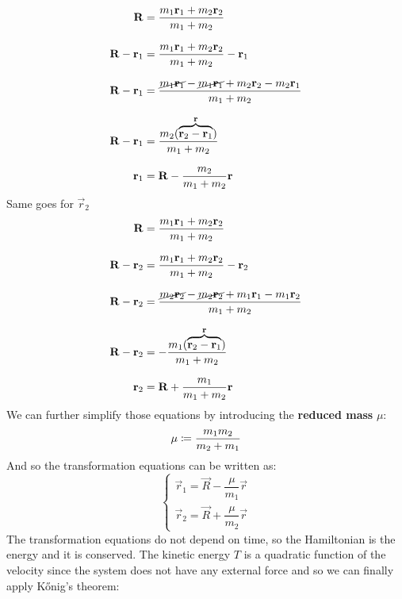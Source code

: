 \begin{equation}
  \begin{split}
    \vec{R} &= \dfrac{m_1\vec{r}_1 + m_2\vec{r}_2}{m_1 + m_2} \\[8pt]
    \vec{R} - \vec{r}_1 &= \dfrac{m_1\vec{r}_1 + m_2\vec{r}_2}{m_1 + m_2} - \vec{r}_1 \\[8pt]
    \vec{R} - \vec{r}_1 &= \dfrac{\cancel{m_1\vec{r}_1} - \cancel{m_1\vec{r}_1} + m_2\vec{r}_2 - m_2\vec{r}_1}{m_1 + m_2} \\[8pt]
    \vec{R} - \vec{r}_1 &= \dfrac{m_2(\overbrace{\vec{r}_2 - \vec{r}_1}^{\vec{r}})}{m_1 + m_2} \\[8pt]
    \vec{r}_1 &= \vec{R} - \dfrac{m_2}{m_1 + m_2}\vec{r}
  \end{split}
\end{equation}
Same goes for $\vec{r}_2$
\begin{equation}
  \begin{split}
    \vec{R} &= \dfrac{m_1\vec{r}_1 + m_2\vec{r}_2}{m_1 + m_2} \\[8pt]
    \vec{R} - \vec{r}_2 &= \dfrac{m_1\vec{r}_1 + m_2\vec{r}_2}{m_1 + m_2} - \vec{r}_2 \\[8pt]
    \vec{R} - \vec{r}_2 &= \dfrac{\cancel{m_2\vec{r}_2} - \cancel{m_2\vec{r}_2} + m_1\vec{r}_1 - m_1\vec{r}_2}{m_1 + m_2} \\[8pt]
    \vec{R} - \vec{r}_2 &= -\dfrac{m_1(\overbrace{\vec{r}_2 - \vec{r}_1}^{\vec{r}})}{m_1 + m_2} \\[8pt]
    \vec{r}_2 &= \vec{R} + \dfrac{m_1}{m_1 + m_2}\vec{r}
  \end{split}
\end{equation}
We can further simplify those equations by introducing the \textbf{reduced mass} $\mu$:
\begin{equation}
  \mu \defineeq \dfrac{m_1 m_2}{m_2 + m_1}
\end{equation}
And so the transformation equations can be written as:
\begin{equation}
  \begin{cases}
    \vec{r}_1 = \vec{R} - \dfrac{\mu}{m_1}\vec{r} \\[8pt]
    \vec{r}_2 = \vec{R} + \dfrac{\mu}{m_2}\vec{r}
  \end{cases}
\end{equation}
The transformation equations do not depend on time, so the Hamiltonian is the energy and it is conserved. The kinetic energy $T$ is a quadratic function of the velocity since the system does not have any external force and so we can finally apply Kőnig's theorem:
